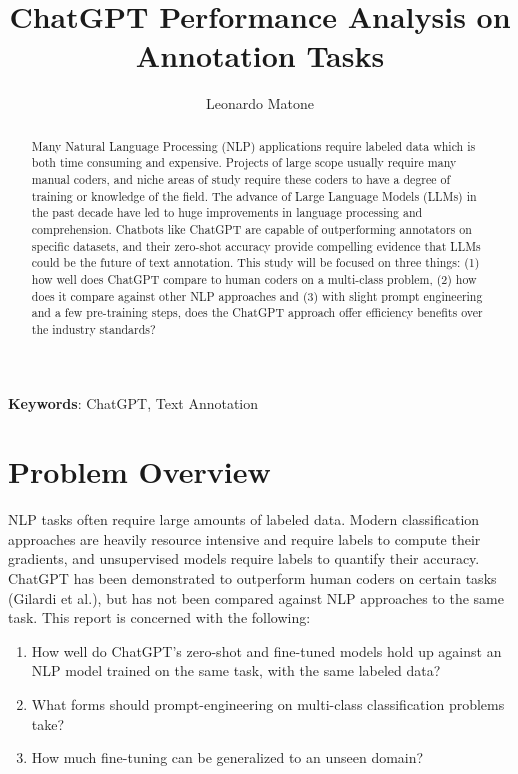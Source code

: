 \documentclass[12pt,a4paper]{article}
\title{ChatGPT Performance Analysis on Annotation Tasks}
\author{Leonardo Matone}
\date{}  %
\begin{document}
\maketitle

\begin{abstract} \noindent Many Natural Language Processing (NLP) applications require labeled data which is both time consuming and expensive. Projects of large scope usually require many manual coders, and niche areas of study require these coders to have a degree of training or knowledge of the field. The advance of Large Language Models (LLMs) in the past decade have led to huge improvements in language processing and comprehension. Chatbots like ChatGPT are capable of outperforming annotators on specific datasets, and their zero-shot accuracy provide compelling evidence that LLMs could be the future of text annotation. This study will be focused on three things: (1) how well does ChatGPT compare to human coders on a multi-class problem, (2) how does it compare against other NLP approaches and (3) with slight prompt engineering and a few pre-training steps, does the ChatGPT approach offer efficiency benefits over the industry standards? 
\end{abstract}

\textbf{Keywords}: ChatGPT, Text Annotation  



\section{Problem Overview}

\noindent NLP tasks often require large amounts of labeled data. Modern classification approaches are heavily resource intensive and require labels to compute their gradients, and unsupervised models require labels to quantify their accuracy. ChatGPT has been demonstrated to outperform human coders on certain tasks (Gilardi et al.), but has not been compared against NLP approaches to the same task. This report is concerned with the following: 

\begin{enumerate}
  \item How well do ChatGPT's zero-shot and fine-tuned models hold up against an NLP model trained on the same task, with the same labeled data?
  \item What forms should prompt-engineering on multi-class classification problems take?
  \item How much fine-tuning can be generalized to an unseen domain?
\end{enumerate}
\end{document}
